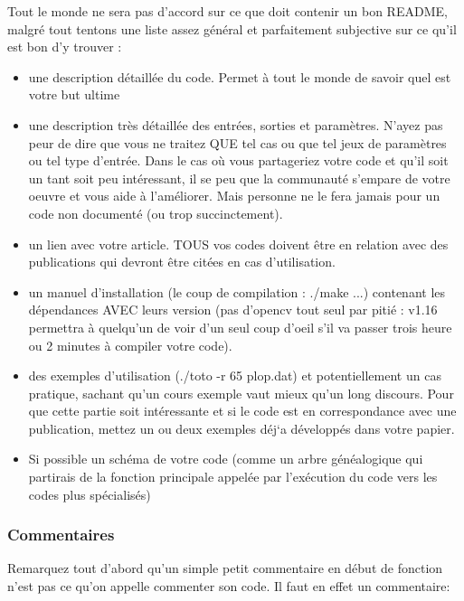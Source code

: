 Tout le monde ne sera pas d'accord sur ce que doit contenir un bon README, malgré tout tentons une
 liste assez général et parfaitement subjective sur ce qu'il est bon d'y trouver : 
\begin{itemize}
\item une description détaillée du code. Permet à tout le monde de savoir quel est votre but ultime
\item une description très détaillée des entrées, sorties et paramètres. N'ayez pas peur de dire que
 vous ne traitez QUE tel cas ou que tel jeux de paramètres ou tel type d'entrée. Dans le cas où vous 
partageriez votre code et qu'il soit un tant soit peu intéressant, il se peu que la communauté s'empare 
de votre oeuvre et vous aide à l'améliorer. Mais personne ne le fera jamais pour un code non documenté 
(ou trop succinctement).
\item un lien avec votre article. TOUS vos codes doivent être en relation avec des publications qui 
devront être citées en cas d'utilisation. 
\item un manuel d'installation (le coup de compilation : ./make ...) contenant les 
dépendances AVEC leurs version (pas d'opencv tout seul par pitié : v1.16 permettra à quelqu'un de 
voir d'un seul coup d'oeil s'il va passer trois heure ou 2 minutes à compiler votre code). 
\item des exemples d'utilisation (./toto -r 65 plop.dat) et potentiellement un cas pratique, sachant
qu'un cours exemple vaut mieux qu'un long discours. Pour que
 cette partie soit intéressante et si le code est en correspondance avec une publication, mettez 
un ou deux exemples d\'ej`a développés dans votre papier.
\item Si possible un schéma de votre code (comme un arbre généalogique qui partirais de la fonction
 principale appelée par l'exécution du code vers les codes plus spécialisés)
\end{itemize}

\subsubsection*{Commentaires}

Remarquez tout d'abord qu'un simple petit commentaire en début de fonction n'est pas 
ce qu'on appelle commenter son code. 
Il faut en effet un commentaire:

